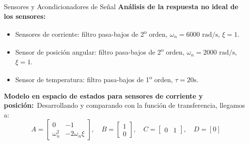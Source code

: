 \documentclass[12pt]{beamer}
\begin{document}
\begin{frame}{Sensores y Acondicionadores de Señal}
    \textbf{Análisis de la respuesta no ideal de los sensores:}
    \begin{itemize}
        \item Sensores de corriente: filtro pasa-bajos de 2\textsuperscript{o} orden, \(\omega_n = 6000 \text{ rad/s}\), \(\xi = 1\).
        \item Sensor de posición angular: filtro pasa-bajos de 2\textsuperscript{o} orden, \(\omega_n = 2000 \text{ rad/s}\), \(\xi = 1\).
        \item Sensor de temperatura: filtro pasa-bajos de 1\textsuperscript{o} orden, \(\tau = 20 \text{s}\).
    \end{itemize}

    \textbf{Modelo en espacio de estados para sensores de corriente y posición:}\
    Desarrollando y comparando con la función de transferencia, llegamos a:
    \[
        A = \begin{bmatrix} 0 & -1 \\ \omega_n^2 & -2 \omega_n \xi \end{bmatrix}, \quad 
        B = \begin{bmatrix} 1 \\ 0 \end{bmatrix}, \quad 
        C = \begin{bmatrix} 0 & 1 \end{bmatrix}, \quad D = [0]
    \]
\end{frame}
\end{document}
